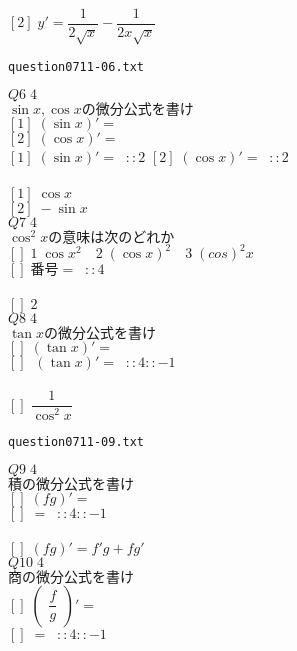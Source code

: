 \documentclass[10pt,dvipdfmx]{jarticle}
\begin{document}
$[2]\;y'=\dfrac{1}{2\sqrt{x}}-\dfrac{1}{2x\sqrt{x}}$\\
\newpage
\begin{center}
\verb|question0711-06.txt|\\
\end{center}
$Q6\;4$\\
$\sin x ,\cos x \text{の微分公式を書け}$\\
$[1]\;(\sin x )'=$\\
$[2]\;(\cos x )'=$\\
$[1]\;(\sin x )'=\;\;::2$ 
$[2]\;(\cos x )'=\;\;::2$ 
\\
\\
$[1]\;\cos x $\\
$[2]\;-\sin x \;$\\
$Q7\;4$\\
${\cos^2x}\text{の意味は次のどれか}$\\
$[]\;1\;\cos x^2 \text{　}2\;(\cos x )^2\text{　}3\;(cos)^2x$\\
$[]\;\text{番号}=\;\;::4$ 
\\
\\
$[]\;2$\\
$Q8\;4$\\
$\tan x \text{の微分公式を書け}$\\
$[]\;(\tan x )'=$\\
$[]\;\;(\tan x )'=\;\;::4::-1$ 
\\
\\
$[]\;\dfrac{1}{\cos^{2}\! x }$\\
\newpage
\begin{center}
\verb|question0711-09.txt|\\
\end{center}
$Q9\;4$\\
$\text{積の微分公式を書け}$\\
$[]\;(fg)'=$\\
$[]\;=\;\;::4::-1$ 
\\
\\
$[]\;(fg)'=f'g+fg'$\\
$Q10\;4$\\
$\text{商の微分公式を書け}$\\
$[]\;\left(\begin{array}{c}\dfrac{f}{g}\end{array}\right)'=$\\
$[]\;=\;\;::4::-1$ 
\\
\\
\end{document}
